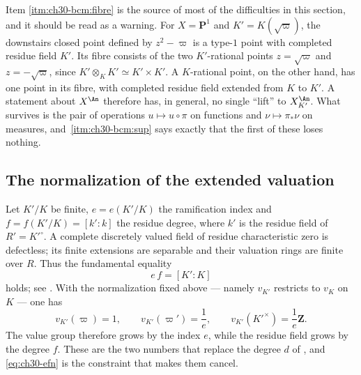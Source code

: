 \begin{remark}
\label{rem:ch30-fibres-not-points}
Item \cref{itm:ch30-bcm:fibre} is the source of most of the difficulties in
this section, and it should be read as a warning.  For $X=\mathbf P^1$ and $K'=K(\sqrt{\varpi})$, the downstairs
closed point defined by $z^2-\varpi$ is a type-$1$ point with completed
residue field $K'$.  Its fibre consists of the two $K'$-rational
points $z=\sqrt{\varpi}$ and $z=-\sqrt{\varpi}$, since
$K'\otimes_KK'\simeq K'\times K'$.
A $K$-rational point, on the other hand, has one point in its fibre,
with completed residue field extended from $K$ to $K'$.  A statement about
$X^{\An}$ therefore has, in general, no single ``lift'' to
$X_{K'}^{\An}$.  What survives is the pair of operations
$u\mapsto u\circ\pi$ on functions and $\nu\mapsto\pi_*\nu$ on measures,
and \,\cref{itm:ch30-bcm:sup} says exactly
that the first of these loses nothing.
\end{remark}

\subsection{The normalization of the extended valuation}
\label{sec:ch30-bc-normalization}

Let $K'/K$ be finite, $e=e(K'/K)$ the ramification index and
$f=f(K'/K)=[k':k]$ the residue degree, where $k'$ is the residue field
of $R'=K'^\circ$.  A complete discretely valued field of residue characteristic zero is
defectless; its finite extensions are separable and their valuation rings
are finite over $R$.  Thus the fundamental equality
\begin{equation}
\label{eq:ch30-efn}
                    e\,f=[K':K]
\end{equation}
holds; see \cite[Ch.~VI]{ZariskiSamuelII}.  With the normalization fixed
above --- namely $v_{K'}$ restricts to $v_K$ on $K$ --- one has
\begin{equation}
\label{eq:ch30-uniformizer-value}
 v_{K'}(\varpi)=1,
 \qquad
 v_{K'}(\varpi')=\frac1e,
 \qquad
 v_{K'}(K'^\times)=\frac1e\mathbf Z .
\end{equation}
The value group therefore grows by the index $e$, while the residue field
grows by the degree $f$.  These are the two numbers that replace the
degree $d$ of , and \eqref{eq:ch30-efn} is the
constraint that makes them cancel.

